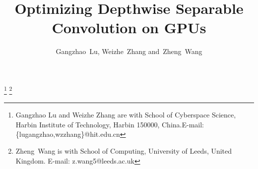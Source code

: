 \documentclass[journal,compsoc,10pt,final]{IEEEtran}
\begin{document}
\title{Optimizing Depthwise Separable Convolution on GPUs}

\author{Gangzhao~Lu, Weizhe~Zhang and~Zheng~Wang}
\thanks{Gangzhao Lu and Weizhe Zhang are with School of Cyberspace Science, Harbin Institute of Technology, Harbin 150000, China.E-mail:\{lugangzhao,wzzhang\}@hit.edu.cn}
\thanks{Zheng~Wang is with School of Computing, University of Leeds, United Kingdom. E-mail: z.wang5@leeds.ac.uk}

\IEEEtitleabstractindextext{

}
\maketitle












\end{document}
